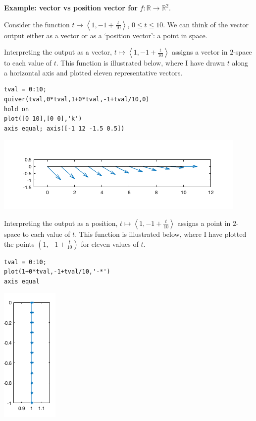 \documentclass[12pt,letterpaper,noanswers]{exam}
\begin{document}
\noindent\textbf{Example: vector vs position vector for} $f:\mathbb{R}\rightarrow\mathbb{R}^2$.

Consider the function $t\mapsto \left\langle1,-1+\frac{t}{10}\right\rangle$, $0\leq t\leq 10$. %
We can think of the vector output either as a vector or as a `position vector': a point in space.
\vspace{0.3cm}

Interpreting the output as a vector, $t\mapsto \left\langle1,-1+\frac{t}{10}\right\rangle$ assigns a vector in $2$-space to each value of $t$.  This function is illustrated below, where I have drawn $t$ along a horizontal axis and plotted eleven representative vectors.
\begin{multicols}{2}
\begin{lstlisting}
tval = 0:10;
quiver(tval,0*tval,1+0*tval,-1+tval/10,0)
hold on
plot([0 10],[0 0],'k')
axis equal; axis([-1 12 -1.5 0.5])
\end{lstlisting}

\includegraphics[scale=0.5]{img/C16vectorline.png}
\end{multicols}

Interpreting the output as a position, $t\mapsto \left\langle1,-1+\frac{t}{10}\right\rangle$ assigns a point in $2$-space to each value of $t$.  This function is illustrated below, where I have plotted the points $\left(1,-1+\frac{t}{10}\right)$ for eleven values of $t$.

\begin{multicols}{2}
\begin{lstlisting}
tval = 0:10;
plot(1+0*tval,-1+tval/10,'-*')
axis equal
\end{lstlisting}
\includegraphics[scale=0.6]{img/C16curve.png}
\end{multicols}
\end{document}
